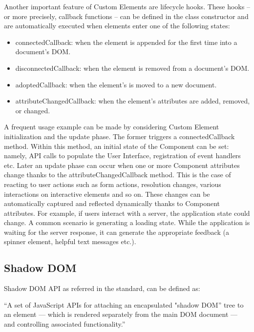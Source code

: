 Another important feature of Custom Elements are lifecycle hooks. These hooks – or more precisely, callback functions – can be defined in the class constructor and are automatically executed when elements enter one of the following states:

\begin{itemize}
\item connectedCallback: when the element is appended for the first time into a document’s DOM.
\item disconnectedCallback: when the element is removed from a document’s DOM.
\item adoptedCallback: when the element’s is moved to a new document.
\item attributeChangedCallback: when the element’s attributes are added, removed, or changed.
\end{itemize}

A frequent usage example can be made by considering Custom Element initialization and the update phase. The former triggers a connectedCallback method. Within this method, an initial state of the Component can be set: namely, API calls to populate the User Interface, registration of event handlers etc. Later an update phase can occur when one or more Component attributes change thanks to the attributeChangedCallback method. This is the case of reacting to user actions such as form actions, resolution changes, various interactions on interactive elements and so on. These changes can be automatically captured and reflected dynamically thanks to Component attributes. For example, if users interact with a server, the application state could change. A common scenario is generating a loading state. While the application is waiting for the server response, it can generate the appropriate feedback (a spinner element, helpful text messages etc.).

\subsection{Shadow DOM}
\label{subsec:shadowDOM}

Shadow DOM API as referred in the standard, can be defined as: 

\begin{displayquote}

“A set of JavaScript APIs for attaching an encapsulated "shadow DOM” tree to an element — which is rendered separately from the main DOM document — and controlling associated functionality.”

\end{displayquote}


